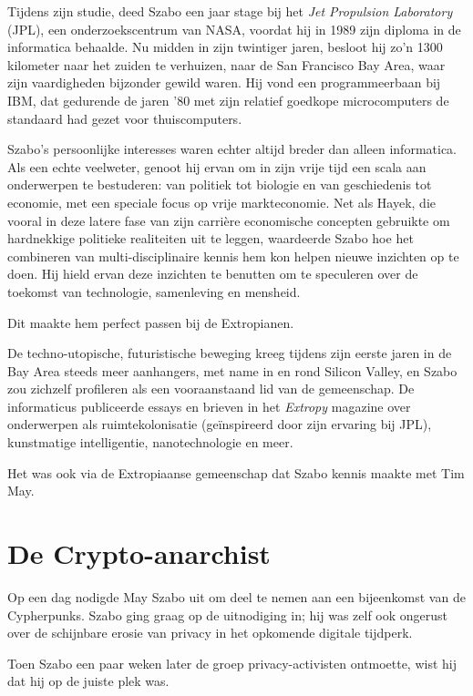 \documentclass[smalldemyvopaper,11pt,twoside,onecolumn,openright,extrafontsizes,hidelinks]{memoir}
\begin{document}
Tijdens zijn studie, deed Szabo een jaar stage bij het \emph{Jet
Propulsion Laboratory} (JPL), een onderzoekscentrum van NASA, voordat
hij in 1989 zijn diploma in de informatica behaalde. Nu midden in zijn
twintiger jaren, besloot hij zo'n 1300 kilometer naar het zuiden te
verhuizen, naar de San Francisco Bay Area, waar zijn vaardigheden
bijzonder gewild waren. Hij vond een programmeerbaan bij IBM, dat
gedurende de jaren '80 met zijn relatief goedkope microcomputers de
standaard had gezet voor thuiscomputers.

Szabo's persoonlijke interesses waren echter altijd breder dan alleen
informatica. Als een echte veelweter, genoot hij ervan om in zijn vrije
tijd een scala aan onderwerpen te bestuderen: van politiek tot biologie
en van geschiedenis tot economie, met een speciale focus op vrije
markteconomie. Net als Hayek, die vooral in deze latere fase van zijn
carrière economische concepten gebruikte om hardnekkige politieke
realiteiten uit te leggen, waardeerde Szabo hoe het combineren van
multi-disciplinaire kennis hem kon helpen nieuwe inzichten op te doen.
Hij hield ervan deze inzichten te benutten om te speculeren over de
toekomst van technologie, samenleving en mensheid.

Dit maakte hem perfect passen bij de Extropianen.

De techno-utopische, futuristische beweging kreeg tijdens zijn eerste
jaren in de Bay Area steeds meer aanhangers, met name in en rond Silicon
Valley, en Szabo zou zichzelf profileren als een vooraanstaand lid van
de gemeenschap. De informaticus publiceerde essays en brieven in het
\emph{Extropy} magazine over onderwerpen als ruimtekolonisatie
(geïnspireerd door zijn ervaring bij JPL), kunstmatige intelligentie,
nanotechnologie en meer.

Het was ook via de Extropiaanse gemeenschap dat Szabo kennis maakte met
Tim May.

\section{De Crypto-anarchist}\label{de-crypto-anarchist}

Op een dag nodigde May Szabo uit om deel te nemen aan een bijeenkomst
van de Cypherpunks. Szabo ging graag op de uitnodiging in; hij was zelf
ook ongerust over de schijnbare erosie van privacy in het opkomende
digitale tijdperk.

Toen Szabo een paar weken later de groep privacy-activisten ontmoette,
wist hij dat hij op de juiste plek was.
\end{document}
